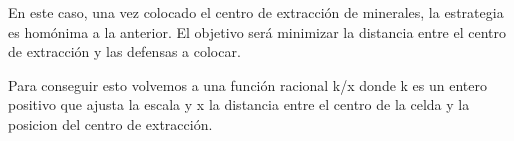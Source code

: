 En este caso, una vez colocado el centro de extracción de minerales, la estrategia es homónima a la anterior. El objetivo será minimizar la distancia entre el centro de extracción y las defensas a colocar. 

Para conseguir esto volvemos a una función racional k/x donde k es un entero positivo que ajusta la escala y x la distancia entre el centro de la celda y la posicion del centro de extracción.

\vspace{5mm}
